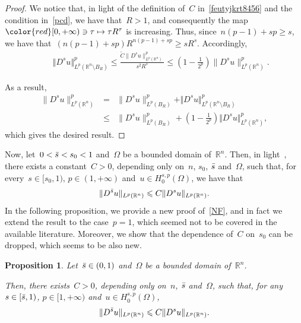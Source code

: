 \documentclass[11pt,hyp,]{nyjm}
\numberwithin{equation}{section}
\newcommand{\R}{\mathbb{R}}
\newtheorem{proposition}[theorem]{Proposition}
\theoremstyle{remark}
\newcommand{\bs}{\Bar{s}}
\renewcommand{\leq}{\leqslant}
\renewcommand{\le}{\leqslant}
\renewcommand{\ge}{\geqslant}
\begin{document}
\begin{proof}
We notice that, in light of the definition of~$C$ in~\eqref{feutyjkrt8456} and the condition in~\eqref{pcd},
we have that~$R>1$, and consequently the map~${\color{red}[0,+\infty)}\ni\tau\mapsto \tau R^\tau$ is increasing.
Thus, since~$n(p-1)+sp\ge s$, we have that~$(n(p-1)+sp) R^{n(p-1)+sp}\ge s R^s$. Accordingly,
\begin{eqnarray*} &&
\Vert D^s u \Vert^p_{L^p(\R^n \setminus B_{R})} 
\le \frac{\widetilde C \|D^su\|^p_{L^p(\R^n)}}{s^2 R^{s}}\le\left(1- \frac1{2^p}\right) \|D^su\|^p_{L^p(\R^n)}.
\end{eqnarray*}

As a result,
\begin{eqnarray*}
\|D^su\|^p_{L^p(\R^n)}&=& \|D^su\|^p_{L^p(B_R)}+\Vert D^s u \Vert^p_{L^p(\R^n \setminus B_{R})}\\& \le&
\|D^su\|^p_{L^p(B_R)}+\left(1-\frac1{2^p}\right)\Vert D^s u \Vert^p_{L^p(\R^n )},
\end{eqnarray*}
which gives the desired result.
\end{proof}

	Now, let~$0< \bs < s_0 <1$ and~$\Omega$ be a bounded domain of~$\R^n$. Then, in light~\cite[Proposition~4.1]{mora}, there exists a constant~$C>0$, depending only on~$n$, $s_0$, $\bs$ and~$\Omega$, such that,
	for every~$s \in [s_0,1)$, $p\in(1, +\infty)$ and~$u \in H_0^{s,p}(\Omega)$, we have that
	\begin{equation}\label{NF}
		 \Vert D^{\bs} u \Vert_{L^p(\R^n)} \leq C \Vert D^s u \Vert_{L^p(\R^n)}.
	\end{equation}
	In the following proposition, we provide a new proof of~\eqref{NF}, 
	and in fact we extend the result to the case~$p=1$, which seemed not
	to be covered in the available literature.
	Moreover, we show that the dependence of~$C$ on~$s_0$ can be dropped, which seems to be also new.
	 
		\begin{proposition}\label{crizzo}
		Let~$\bs \in (0,1)$ and~$\Omega$ be a bounded domain of~$\R^n$.
			
			 Then, there exists~$C>0$,
			 depending only on~$n$, $\bs$ and~$\Omega$,
			 such that, for any~$s \in [\bs,1)$, $p \in [1,+\infty)$ and~$u \in H_0^{s,p}(\Omega)$, 
			\begin{equation}\label{re}
				\Vert D^{\bs}u \Vert_{L^p(\R^n)} \leq C\Vert D^s u \Vert_{L^p(\R^n)}. 
			\end{equation}
		\end{proposition}
		
\end{document}
